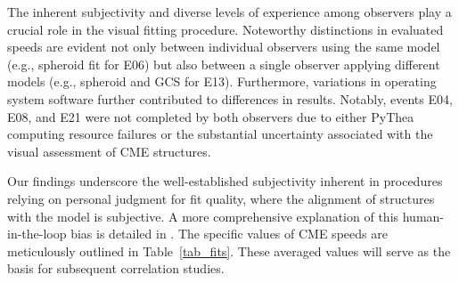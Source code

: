The inherent subjectivity and diverse levels of experience among observers play a crucial role in the visual fitting procedure. Noteworthy distinctions in evaluated speeds are evident not only between individual observers using the same model (e.g., spheroid fit for E06) but also between a single observer applying different models (e.g., spheroid and GCS for E13). Furthermore, variations in operating system software further contributed to differences in results. Notably, events E04, E08, and E21 were not completed by both observers due to either PyThea computing resource failures or the substantial uncertainty associated with the visual assessment of CME structures.

Our findings underscore the well-established subjectivity inherent in procedures relying on personal judgment for fit quality, where the alignment of structures with the model is subjective. A more comprehensive explanation of this human-in-the-loop bias is detailed in \citep{verbeke_2022}. The specific values of CME speeds are meticulously outlined in Table~\ref{tab_fits}. These averaged values will serve as the basis for subsequent correlation studies.


